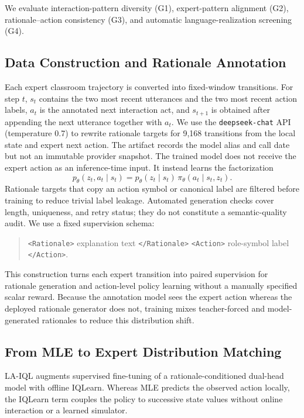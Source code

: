 \documentclass[manuscript,review,anonymous]{acmart}
\begin{document}
We evaluate interaction-pattern diversity (G1), expert-pattern alignment (G2),
rationale--action consistency (G3), and automatic language-realization
screening (G4).

\subsection{Data Construction and Rationale Annotation}

Each expert classroom trajectory is converted into fixed-window transitions.
For step $t$, $s_t$ contains the two most recent utterances and the two most recent action labels, $a_t$ is the annotated next interaction act, and $s_{t+1}$ is obtained after appending the next utterance together with $a_t$.
We use the \texttt{deepseek-chat} API (temperature 0.7) to rewrite rationale
targets for 9,168 transitions from the local state and expert next action. The
artifact records the model alias and call date but not an immutable provider
snapshot. The trained model does not receive the expert action as an
inference-time input. It instead learns the factorization
\begin{equation}
p_\theta(z_t,a_t\mid s_t)
=p_\theta(z_t\mid s_t)\,\pi_\theta(a_t\mid s_t,z_t).
\label{eq:rationale-action-factorization}
\end{equation}
Rationale targets that copy an action symbol or canonical label are filtered before training to reduce trivial label leakage. Automated generation checks cover length, uniqueness, and retry status; they do not constitute a semantic-quality audit.
We use a fixed supervision schema:
\begin{quote}
\small
\texttt{<Rationale>} explanation text \texttt{</Rationale>} \quad
\texttt{<Action>} role-symbol label \texttt{</Action>}.
\end{quote}
This construction turns each expert transition into paired supervision for rationale generation and action-level policy learning without a manually specified scalar reward. Because the annotation model sees the expert action whereas the deployed rationale generator does not, training mixes teacher-forced and model-generated rationales to reduce this distribution shift.

\subsection{From MLE to Expert Distribution Matching}

LA-IQL augments supervised fine-tuning of a rationale-conditioned dual-head model with offline IQLearn. Whereas MLE predicts the observed action locally, the IQLearn term couples the policy to successive state values without online interaction or a learned simulator.
\end{document}
